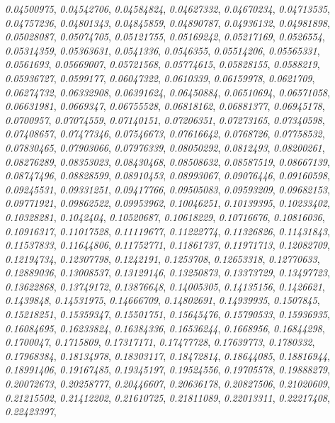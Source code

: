 \documentclass[letterpaper,10pt,english]{sphinxmanual}
\begin{document}
\begin{fulllineitems}
\emph{0.04500975}, \emph{0.04542706}, \emph{0.04584824}, \emph{0.04627332}, \emph{0.04670234}, \emph{0.04713535}, \emph{0.04757236}, \emph{0.04801343}, \emph{0.04845859}, \emph{0.04890787}, \emph{0.04936132}, \emph{0.04981898}, \emph{0.05028087}, \emph{0.05074705}, \emph{0.05121755}, \emph{0.05169242}, \emph{0.05217169}, \emph{0.0526554}, \emph{0.05314359}, \emph{0.05363631}, \emph{0.0541336}, \emph{0.0546355}, \emph{0.05514206}, \emph{0.05565331}, \emph{0.0561693}, \emph{0.05669007}, \emph{0.05721568}, \emph{0.05774615}, \emph{0.05828155}, \emph{0.0588219}, \emph{0.05936727}, \emph{0.0599177}, \emph{0.06047322}, \emph{0.0610339}, \emph{0.06159978}, \emph{0.0621709}, \emph{0.06274732}, \emph{0.06332908}, \emph{0.06391624}, \emph{0.06450884}, \emph{0.06510694}, \emph{0.06571058}, \emph{0.06631981}, \emph{0.0669347}, \emph{0.06755528}, \emph{0.06818162}, \emph{0.06881377}, \emph{0.06945178}, \emph{0.0700957}, \emph{0.07074559}, \emph{0.07140151}, \emph{0.07206351}, \emph{0.07273165}, \emph{0.07340598}, \emph{0.07408657}, \emph{0.07477346}, \emph{0.07546673}, \emph{0.07616642}, \emph{0.0768726}, \emph{0.07758532}, \emph{0.07830465}, \emph{0.07903066}, \emph{0.07976339}, \emph{0.08050292}, \emph{0.0812493}, \emph{0.08200261}, \emph{0.08276289}, \emph{0.08353023}, \emph{0.08430468}, \emph{0.08508632}, \emph{0.08587519}, \emph{0.08667139}, \emph{0.08747496}, \emph{0.08828599}, \emph{0.08910453}, \emph{0.08993067}, \emph{0.09076446}, \emph{0.09160598}, \emph{0.09245531}, \emph{0.09331251}, \emph{0.09417766}, \emph{0.09505083}, \emph{0.09593209}, \emph{0.09682153}, \emph{0.09771921}, \emph{0.09862522}, \emph{0.09953962}, \emph{0.10046251}, \emph{0.10139395}, \emph{0.10233402}, \emph{0.10328281}, \emph{0.1042404}, \emph{0.10520687}, \emph{0.10618229}, \emph{0.10716676}, \emph{0.10816036}, \emph{0.10916317}, \emph{0.11017528}, \emph{0.11119677}, \emph{0.11222774}, \emph{0.11326826}, \emph{0.11431843}, \emph{0.11537833}, \emph{0.11644806}, \emph{0.11752771}, \emph{0.11861737}, \emph{0.11971713}, \emph{0.12082709}, \emph{0.12194734}, \emph{0.12307798}, \emph{0.1242191}, \emph{0.1253708}, \emph{0.12653318}, \emph{0.12770633}, \emph{0.12889036}, \emph{0.13008537}, \emph{0.13129146}, \emph{0.13250873}, \emph{0.13373729}, \emph{0.13497723}, \emph{0.13622868}, \emph{0.13749172}, \emph{0.13876648}, \emph{0.14005305}, \emph{0.14135156}, \emph{0.1426621}, \emph{0.1439848}, \emph{0.14531975}, \emph{0.14666709}, \emph{0.14802691}, \emph{0.14939935}, \emph{0.1507845}, \emph{0.15218251}, \emph{0.15359347}, \emph{0.15501751}, \emph{0.15645476}, \emph{0.15790533}, \emph{0.15936935}, \emph{0.16084695}, \emph{0.16233824}, \emph{0.16384336}, \emph{0.16536244}, \emph{0.1668956}, \emph{0.16844298}, \emph{0.1700047}, \emph{0.1715809}, \emph{0.17317171}, \emph{0.17477728}, \emph{0.17639773}, \emph{0.1780332}, \emph{0.17968384}, \emph{0.18134978}, \emph{0.18303117}, \emph{0.18472814}, \emph{0.18644085}, \emph{0.18816944}, \emph{0.18991406}, \emph{0.19167485}, \emph{0.19345197}, \emph{0.19524556}, \emph{0.19705578}, \emph{0.19888279}, \emph{0.20072673}, \emph{0.20258777}, \emph{0.20446607}, \emph{0.20636178}, \emph{0.20827506}, \emph{0.21020609}, \emph{0.21215502}, \emph{0.21412202}, \emph{0.21610725}, \emph{0.21811089}, \emph{0.22013311}, \emph{0.22217408}, \emph{0.22423397}, 
\end{fulllineitems}
\end{document}
